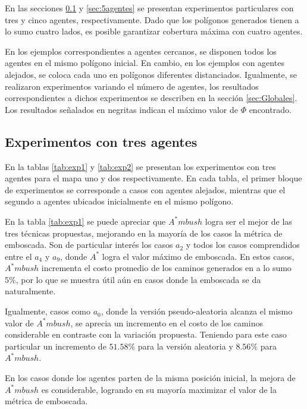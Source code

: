 \documentclass{egpubl}
\begin{document}
En las secciones \ref{sec:3agentes} y \ref{sec:5agentes} se presentan
experimentos
 particulares con tres y cinco
agentes, respectivamente. Dado que los polígonos generados tienen a lo sumo
cuatro lados, es posible garantizar cobertura
máxima con cuatro agentes.

En los ejemplos correspondientes a agentes cercanos,
se disponen todos los agentes en el mismo polígono
inicial. En cambio, en los ejemplos con agentes alejados,
se coloca cada uno en polígonos diferentes distanciados.
Igualmente, se realizaron
experimentos variando el número de agentes, los resultados
correspondientes a dichos experimentos se describen en la sección \ref{sec:Globales}.
Los resultados señalados en negritas indican el máximo valor
de $\Phi$ encontrado.

\subsection{Experimentos con tres agentes}
\label{sec:3agentes}



En la tablas \ref{tab:exp1} y \ref{tab:exp2} se presentan
los experimentos con tres agentes para el mapa uno y dos
respectivamente. En cada tabla, el primer bloque de experimentos
se corresponde a casos con agentes alejados, mientras que el
segundo a agentes ubicados inicialmente en el mismo polígono.



En la tabla \ref{tab:exp1} se puede apreciar que $A^*mbush$
logra ser el mejor de las tres técnicas propuestas, mejorando
en la ma\-yo\-rí\-a de los casos la métrica de emboscada. Son de
particular interés los casos $a_2$ y todos los casos comprendidos
entre el $a_4$ y $a_9$, donde $A^*$ logra el valor máximo de
emboscada. En estos casos, $A^*mbush$ incrementa el costo promedio
de los caminos generados en a lo sumo $5\%$, por lo que se muestra
útil aún en casos donde la emboscada se da naturalmente.

Igualmente, casos como $a_0$, donde la versión pseudo-aleatoria
alcanza el mismo valor de $A^*mbush$, se aprecia un incremento
en el costo de los caminos considerable en contraste con la
variación propuesta. Teniendo para este caso
particular un incremento de $51.58\%$ para la versión aleatoria
y $8.56\%$ para $A^*mbush$.

En los casos donde los agentes parten de la misma posición inicial,
la mejora de $A^*mbush$ es considerable, logrando en su mayoría
maximizar el valor de la métrica de emboscada.
\end{document}
